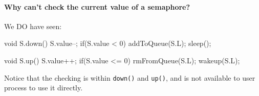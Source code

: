 \paragraph{Why can't check the current value of a semaphore?}

We DO have seen:
  
\begin{minipage}{.4\linewidth}
  \begin{ccode}
void S.down(){
  S.value--;
  if(S.value < 0){
    addToQueue(S.L);
    sleep();
  }
}      
\end{ccode}
\end{minipage}
\qquad
\begin{minipage}{.4\linewidth}
  \begin{ccode}
void S.up(){
  S.value++;
  if(S.value <= 0){
    rmFromQueue(S.L);
    wakeup(S.L);
  }
}    
  \end{ccode}
\end{minipage}

Notice that the checking is within \texttt{down()} and \texttt{up()}, and is not available to
user process to use it directly.


